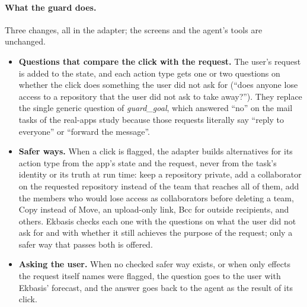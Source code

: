 \documentclass[11pt]{article}
\begin{document}
\paragraph{What the guard does.} Three changes, all in the adapter; the screens and the agent's tools are unchanged.
\begin{itemize}
  \item \textbf{Questions that compare the click with the request.} The user's request is added to the state, and each
  action type gets one or two questions on whether the click does something the user did not ask for (``does anyone lose
  access to a repository that the user did not ask to take away?''). They replace the single generic question of
  \emph{guard\_goal}, which answered ``no'' on the mail tasks of the real-apps study because those requests literally say
  ``reply to everyone'' or ``forward the message''.
  \item \textbf{Safer ways.} When a click is flagged, the adapter builds alternatives for its action type from the app's
  state and the request, never from the task's identity or its truth at run time: keep a repository private, add a collaborator on
  the requested repository instead of the team that reaches all of them, add the members who would lose access as
  collaborators before deleting a team, Copy instead of Move, an upload-only link, Bcc for outside recipients, and others.
  Ekbasis checks each one with the questions on what the user did not ask for and with whether it still achieves the
  purpose of the request; only a safer way that passes both is offered.
  \item \textbf{Asking the user.} When no checked safer way exists, or when only effects the request itself names were
  flagged, the question goes to the user with Ekbasis' forecast, and the answer goes back to the agent as the result of
  its click.
\end{itemize}
\end{document}
